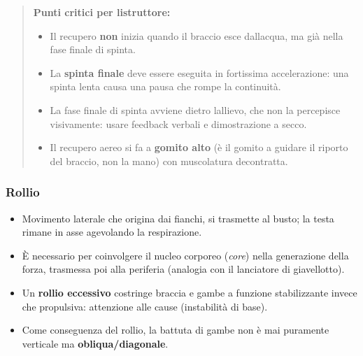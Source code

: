 \documentclass[a4paper,11pt]{article}
\providecommand{\tightlist}{%
  \setlength{\itemsep}{0pt}\setlength{\parskip}{0pt}}
\begin{document}
\begin{quote}
      \textbf{Punti critici per l\textquotesingle istruttore:}

      \begin{itemize}
            \tightlist
            \item
                  Il recupero \textbf{non} inizia quando il braccio esce
                  dall\textquotesingle acqua, ma già nella fase finale di spinta.
            \item
                  La \textbf{spinta finale} deve essere eseguita in fortissima
                  accelerazione: una spinta lenta causa una pausa che rompe la
                  continuità.
            \item
                  La fase finale di spinta avviene dietro l\textquotesingle allievo, che
                  non la percepisce visivamente: usare feedback verbali e dimostrazione
                  a secco.
            \item
                  Il recupero aereo si fa a \textbf{gomito alto} (è il gomito a guidare
                  il riporto del braccio, non la mano) con muscolatura decontratta.
      \end{itemize}
\end{quote}

\subsubsection{Rollio}\label{rollio}

\begin{itemize}
      \tightlist
      \item
            Movimento laterale che origina dai fianchi, si trasmette al busto; la
            testa rimane in asse agevolando la respirazione.
      \item
            È necessario per coinvolgere il nucleo corporeo (\emph{core}) nella
            generazione della forza, trasmessa poi alla periferia (analogia con il
            lanciatore di giavellotto).
      \item
            Un \textbf{rollio eccessivo} costringe braccia e gambe a funzione
            stabilizzante invece che propulsiva: attenzione alle cause
            (instabilità di base).
      \item
            Come conseguenza del rollio, la battuta di gambe non è mai puramente
            verticale ma \textbf{obliqua/diagonale}.
\end{itemize}
\end{document}
